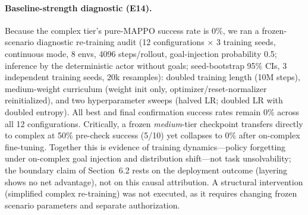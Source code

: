\documentclass[sigconf,anonymous]{aamas}
\begin{document}
\paragraph{Baseline-strength diagnostic (E14).}
Because the complex tier's pure-MAPPO success rate is 0\%, we ran a frozen-scenario diagnostic re-training audit (12 configurations $\times$ 3 training seeds, continuous mode, 8 envs, 4096 steps/rollout, goal-injection probability 0.5; inference by the deterministic actor without goals; seed-bootstrap 95\% CIs, 3 independent training seeds, 20k resamples): doubled training length (10M steps), medium-weight curriculum (weight init only, optimizer/reset-normalizer reinitialized), and two hyperparameter sweeps (halved LR; doubled LR with doubled entropy). All best and final confirmation success rates remain 0\% across all 12 configurations. Critically, a frozen \emph{medium}-tier checkpoint transfers directly to complex at 50\% pre-check success (5/10) yet collapses to 0\% after on-complex fine-tuning. Together this is evidence of training dynamics---policy forgetting under on-complex goal injection and distribution shift---not task unsolvability; the boundary claim of Section~6.2 rests on the deployment outcome (layering shows no net advantage), not on this causal attribution. A structural intervention (simplified complex re-training) was not executed, as it requires changing frozen scenario parameters and separate authorization.
\end{document}
